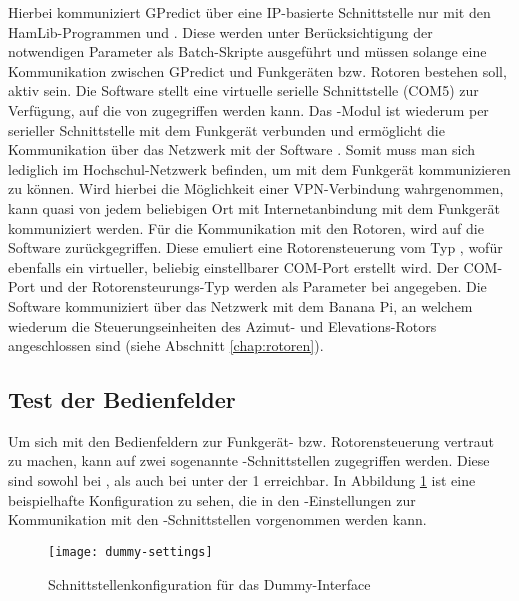 Hierbei kommuniziert GPredict über eine IP-basierte Schnittstelle nur mit den HamLib-Programmen  und . Diese werden unter Berücksichtigung der notwendigen Parameter als Batch-Skripte ausgeführt und müssen solange eine Kommunikation zwischen GPredict und Funkgeräten bzw. Rotoren bestehen soll, aktiv sein.\newpar
Die Software  stellt eine virtuelle serielle Schnittstelle (COM5) zur Verfügung, auf die von  zugegriffen werden kann. Das -Modul ist wiederum per serieller Schnittstelle mit dem Funkgerät verbunden und ermöglicht die Kommunikation über das Netzwerk mit der Software . Somit muss man sich lediglich im Hochschul-Netzwerk befinden, um mit dem Funkgerät kommunizieren zu können. Wird hierbei die Möglichkeit einer VPN-Verbindung wahrgenommen, kann quasi von jedem beliebigen Ort mit Internetanbindung mit dem Funkgerät kommuniziert werden.\newpar
Für die Kommunikation mit den Rotoren, wird auf die Software  zurückgegriffen. Diese emuliert eine Rotorensteuerung vom Typ , wofür ebenfalls ein virtueller, beliebig einstellbarer COM-Port erstellt wird. Der COM-Port und der Rotorensteurungs-Typ werden als Parameter bei  angegeben. Die Software  kommuniziert über das Netzwerk mit dem Banana Pi, an welchem wiederum die Steuerungseinheiten des Azimut- und Elevations-Rotors angeschlossen sind (siehe Abschnitt \ref{chap:rotoren}).

\subsection{Test der Bedienfelder}

Um sich mit den Bedienfeldern zur Funkgerät- bzw. Rotorensteuerung vertraut zu machen, kann auf zwei sogenannte -Schnittstellen zugegriffen werden. Diese sind sowohl bei , als auch bei  unter der  1 erreichbar. In Abbildung \ref{fig:dummysettings} ist eine beispielhafte Konfiguration zu sehen, die in den -Einstellungen zur Kommunikation mit den -Schnittstellen vorgenommen werden kann.

\begin{figure}[h]
	\centering
	\texttt{[image: dummy-settings]}
	\caption{Schnittstellenkonfiguration für das Dummy-Interface}
	\label{fig:dummysettings} 
\end{figure}

